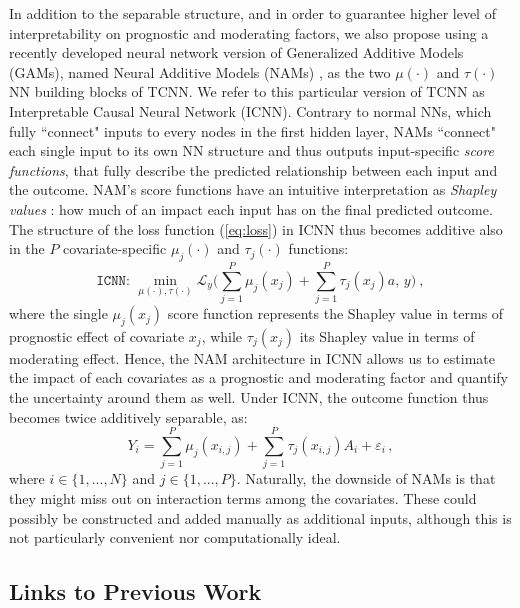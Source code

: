 \documentclass[nohyperref]{article}
\theoremstyle{plain}
\theoremstyle{definition}
\theoremstyle{remark}
\begin{document}
In addition to the separable structure, and in order to guarantee higher level of interpretability on prognostic and moderating factors, we also propose using a recently developed neural network version of Generalized Additive Models (GAMs), named Neural Additive Models (NAMs) \citep{agarwal_2021}, as the two $\mu(\cdot)$ and $\tau(\cdot)$ NN building blocks of TCNN. We refer to this particular version of TCNN as Interpretable Causal Neural Network (ICNN). Contrary to normal NNs, which fully ``connect" inputs to every nodes in the first hidden layer, NAMs ``connect" each single input to its own NN structure and thus outputs input-specific \emph{score functions}, that fully describe the predicted relationship between each input and the outcome. NAM's score functions have an intuitive interpretation as \emph{Shapley values} \citep{shapley_1952}: how much of an impact each input has on the final predicted outcome. The structure of the loss function (\ref{eq:loss}) in ICNN thus becomes additive also in the $P$ covariate-specific $\mu_j(\cdot)$ and $\tau_j(\cdot)$ functions:
\begin{equation*}
    \texttt{ICNN: } \min_{\mu(\cdot), \tau(\cdot)} \mathcal{L}_y \Big(\sum^P_{j=1} \mu_j(x_j) + \sum^P_{j=1} \tau_j(x_j) a, \, y \Big)~,
\end{equation*}
where the single $\mu_j(x_j)$ score function represents the Shapley value in terms of prognostic effect of covariate $x_j$, while $\tau_j(x_j)$ its Shapley value in terms of moderating effect. Hence, the NAM architecture in ICNN allows us to estimate the impact of each covariates as a prognostic and moderating factor and quantify the uncertainty around them as well. Under ICNN, the outcome function thus becomes twice additively separable, as:
\begin{equation}
    Y_i = \sum^P_{j=1} \mu_j(x_{i,j}) + \sum^P_{j=1} \tau_j(x_{i,j}) A_i + \varepsilon_i \,,
\end{equation}
where $i \in \{1,...,N\}$ and $j \in \{1,...,P\}$. Naturally, the downside of NAMs is that they might miss out on interaction terms among the covariates. These could possibly be constructed and added manually as additional inputs, although this is not particularly convenient nor computationally ideal.

\subsection{Links to Previous Work}
\end{document}
